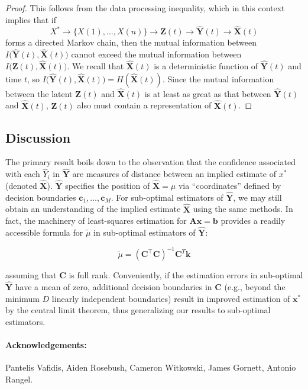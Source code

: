 \documentclass[12pt]{article}
\begin{document}
\begin{proof}
	This follows from the data processing inequality, which in this context implies that if 
	\begin{equation}
		X^* \to \{X(1), \dots, X(n)\} \to \mathbf{Z}(t) \to \hat{\mathbf{Y}}(t) \to \hat{\mathbf X}(t) 
	\end{equation}
	forms a directed Markov chain, then the mutual information between $I\big(\hat{\mathbf Y}(t), \hat{\mathbf X}(t)\big)$ cannot exceed the mutual information between $I\big(\mathbf Z(t), \hat{\mathbf X}(t)\big)$.
	We recall that $\hat{\mathbf X}(t)$ is a deterministic function of $\hat{\mathbf Y}(t)$ and time $t$, so $I\big(\hat{\mathbf Y}(t), \hat{\mathbf X}(t)\big) = H(\hat{\mathbf X}(t))$. 
	Since the mutual information between the latent $\mathbf Z(t)$ and $\hat{\mathbf X}(t)$ is at least as great as that between $\hat{\mathbf Y}(t)$ and $\hat{\mathbf X}(t)$, $\mathbf Z(t)$ also must contain a representation of $\hat{\mathbf X}(t)$. 
\end{proof}



\subsection{Discussion} 

The primary result boils down to the observation that the confidence associated with each $\hat Y_i$ in $\hat{\mathbf Y}$ are measures of distance between an implied estimate of $x^*$ (denoted $\hat {\mathbf X}$). 
$\hat{\mathbf Y}$ specifies the position of $\hat{\mathbf X} = \mu$ via ``coordinates'' defined by decision boundaries $\mathbf c_1, \dots, \mathbf c_M$. 
For sub-optimal estimators of $\hat{\mathbf Y}$, we may still obtain an understanding of the implied estimate $\hat{\mathbf X}$ using the same methods. 
In fact, the machinery of least-squares estimation for $\mathbf {Ax = b}$ provides a readily accessible formula for $\tilde \mu$ in sub-optimal estimators of $\hat{\mathbf Y}$: 

\begin{equation}
	\tilde \mu = (\mathbf{C^\top C})^{-1}\mathbf C^T \mathbf k
\end{equation}

assuming that $\mathbf C$ is full rank. Conveniently, if the estimation errors in sub-optimal $\hat{\mathbf Y}$ have a mean of zero, additional decision boundaries in $\mathbf C$ (e.g., beyond the minimum $D$ linearly independent boundaries) result in improved estimation of $\mathbf x^*$ by the central limit theorem, thus generalizing our results to sub-optimal estimators. 




\paragraph{Acknowledgements: } Pantelis Vafidis, Aiden Rosebush, Cameron Witkowski, James Gornett, Antonio Rangel. 
\end{document}
